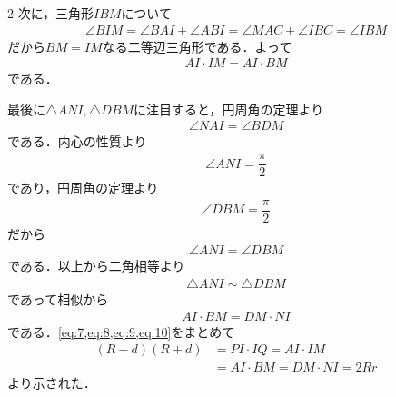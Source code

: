 \documentclass[../../main.tex]{subfiles}
\begin{document}
\begin{multicols}{2}
  次に，三角形$IBM$について
  \begin{align}
    \angle BIM
    = \angle BAI + \angle ABI
    = \angle MAC + \angle IBC
    = \angle IBM
  \end{align}
  だから$BM=IM$なる二等辺三角形である．よって
  \begin{align}
    AI \cdot IM = AI \cdot BM \label{eq:9}
  \end{align}
  である．

  最後に$\triangle ANI,\triangle DBM$に注目すると，円周角の定理より
  \begin{align}
    \angle NAI = \angle BDM
  \end{align}
  である．内心の性質より
  \begin{align}
    \angle ANI = \dfrac{\pi}{2}
  \end{align}
  であり，円周角の定理より
  \begin{align}
    \angle DBM = \dfrac{\pi}{2}
  \end{align}
  だから
  \begin{align}
    \angle ANI = \angle DBM
  \end{align}
  である．以上から二角相等より
  \begin{align}
    \triangle ANI \sim \triangle DBM
  \end{align}
  であって相似から
  \begin{align}
    AI \cdot BM = DM \cdot NI \label{eq:10}
  \end{align}
  である．\cref{eq:7,eq:8,eq:9,eq:10}をまとめて
  \begin{align}
    (R-d)(R+d)
    &= PI \cdot IQ
    = AI \cdot IM \\
    &= AI \cdot BM
    = DM \cdot NI = 2Rr
  \end{align}
  より示された．


\end{multicols}
\end{document}
